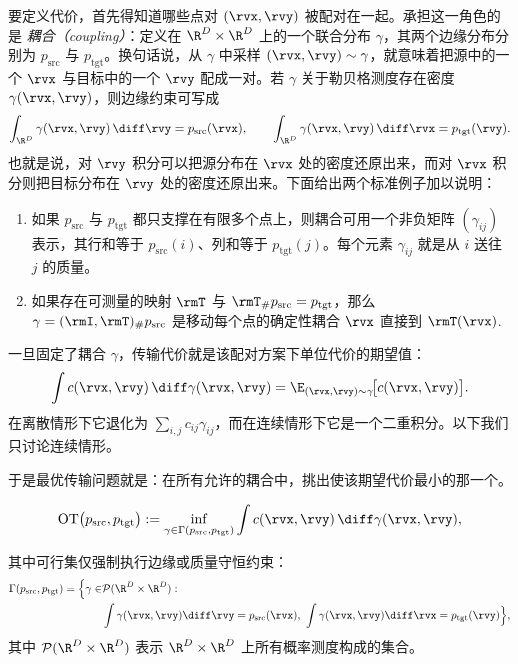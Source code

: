 要定义代价，首先得知道哪些点对 $(\rvx,\rvy)$ 被配对在一起。承担这一角色的是
\emph{耦合（coupling）}：定义在 $\R^D\times\R^D$ 上的一个联合分布 $\gamma$，其两个边缘分布分别为
$p_{\mathrm{src}}$ 与 $p_{\mathrm{tgt}}$。换句话说，从 $\gamma$ 中采样 $(\rvx,\rvy)\sim\gamma$，就意味着把源中的一个 $\rvx$ 与目标中的一个 $\rvy$ 配成一对。若 $\gamma$ 关于勒贝格测度存在密度 $\gamma(\rvx,\rvy)$，则边缘约束可写成
\[
\int_{\R^D} \gamma(\rvx,\rvy)\,\diff \rvy = p_{\mathrm{src}}(\rvx),
\qquad
\int_{\R^D} \gamma(\rvx,\rvy)\,\diff \rvx = p_{\mathrm{tgt}}(\rvy).
\]
也就是说，对 $\rvy$ 积分可以把源分布在 $\rvx$ 处的密度还原出来，而对 $\rvx$ 积分则把目标分布在 $\rvy$ 处的密度还原出来。下面给出两个标准例子加以说明：
\begin{enumerate}
    \item {}
    如果 $p_{\mathrm{src}}$ 与 $p_{\mathrm{tgt}}$ 都只支撑在有限多个点上，则耦合可用一个非负矩阵 $(\gamma_{ij})$ 表示，其行和等于 $p_{\mathrm{src}}(i)$、列和等于 $p_{\mathrm{tgt}}(j)$。每个元素 $\gamma_{ij}$ 就是从 $i$ 送往 $j$ 的质量。
    \item {}
    如果存在可测量的映射 $\rmT$ 与 $\rmT_\#p_{\mathrm{src}}=p_{\mathrm{tgt}}$，那么
    $\gamma=(\rmI,\rmT)_\#p_{\mathrm{src}}$ 是移动每个点的确定性耦合
    $\rvx$ 直接到 $\rmT(\rvx)$.
\end{enumerate}

一旦固定了耦合 $\gamma$，传输代价就是该配对方案下单位代价的期望值：
\[
\int c(\rvx,\rvy)\,\diff\gamma(\rvx,\rvy)
=\E_{(\rvx,\rvy)\sim\gamma}\!\big[c(\rvx,\rvy)\big].
\]
在离散情形下它退化为 $\sum_{i,j} c_{ij}\gamma_{ij}$，而在连续情形下它是一个二重积分。以下我们只讨论连续情形。

于是最优传输问题就是：在所有允许的耦合中，挑出使该期望代价最小的那一个。
\begin{mdframed}
\begin{equation}\label{eq:ot}
\mathrm{OT}\big(p_{\mathrm{src}},p_{\mathrm{tgt}}\big)
:= \inf_{\gamma\in\Gamma(p_{\mathrm{src}},p_{\mathrm{tgt}})}
\int c(\rvx,\rvy)\,\diff\gamma(\rvx,\rvy),
\end{equation}
\end{mdframed}
其中可行集仅强制执行边缘或质量守恒约束：
\begin{align*}
    \Gamma(p_{\mathrm{src}},p_{\mathrm{tgt}})
= \Big\{\gamma \in &\mathcal{P}(\R^D\times\R^D): \\
&\int \gamma(\rvx,\rvy) \diff \rvy = p_{\mathrm{src}}(\rvx),\,\,
\int \gamma(\rvx,\rvy)\diff \rvx = p_{\mathrm{tgt}}(\rvy)\Big\},
\end{align*}
其中 $\mathcal{P}(\R^D\times\R^D)$ 表示 $\R^D\times\R^D$ 上所有概率测度构成的集合。



